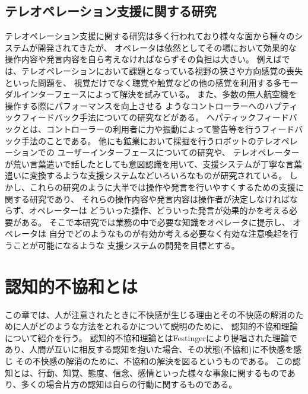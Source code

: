 \documentclass{kuisthesis}
\begin{document}
\subsection{テレオペレーション支援に関する研究}
テレオペレーション支援に関する研究は多く行われており様々な面から種々のシステムが開発されてきたが、
オペレータは依然としてその場において効果的な操作内容や発言内容を自ら考えなければならずその負担は大きい。
例えば\cite{chen2007human,triantafyllidis2020study}では、テレオペレーションにおいて課題となっている視野の狭さや方向感覚の喪失といった問題を、
視覚だけでなく聴覚や触覚などの他の感覚を利用する多モーダルインターフェースによって解決を試みている。
また、多数の無人航空機を操作する際にパフォーマンスを向上させる
ようなコントローラーへのハプティックフィードバック手法についての研究\cite{son2011measuring}などがある。
へパティックフィードバックとは、コントローラーの利用者に力や振動によって警告等を行うフィードバック手法のことである。
他にも鉱業において採掘を行うロボットのテレオペレーションでの
ユーザーインターフェースについての研究\cite{hainsworth2001teleoperation}や、
テレオペレーターが荒い言葉遣いで話したとしても意図認識を用いて、支援システムが丁寧な言葉遣いに変換するような支援システム\cite{Daneshmand2023}などいろいろなものが研究されている。
しかし、これらの研究のように大半では操作や発言を行いやすくするための支援に関する研究であり、
それらの操作内容や発言内容は操作者が決定しなければならず、オペレーターは
どういった操作、どういった発言が効果的かを考える必要がある。
そこで本研究では業務の中で必要な知識をオペレータに提示し、
オペレータは
自分でどのようなものが有効か考える必要なく有効な注意喚起を行うことが可能になるような
支援システムの開発を目標とする。


\section{認知的不協和とは} %
\label{sec: CDT}
この章では、人が注意されたときに不快感が生じる理由とその不快感の解消のために人がどのような方法をとれるかについて説明のために、
認知的不協和理論について紹介を行う。
認知的不協和理論\cite{Festinger1957}とはFestingerにより提唱された理論であり、人間が互いに相反する認知を抱いた場合、その状態(不協和)に不快感を感じ
その不快感の解消のために、不協和の解決を図るというものである。
この認知とは、行動、知覚、態度、信念、感情といった様々な事象に関するものであり、多くの場合片方の認知は自らの行動に関するものである。
\end{document}
